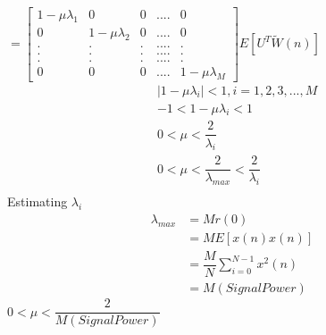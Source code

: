 \documentclass[journal,12pt,twocolumn]{IEEEtran}
\begin{document}
$ =\begin{bmatrix}
   1 - \mu \lambda_1 & 0 & 0 & .... & 0 \\0 & 1 - \mu \lambda_2 & 0 &  .... & 0\\ . & . & . & .... & . \\
   . & . & . & .... & .\\ . & . & . & .... & .\\
0 & 0 & 0 & .... & 1 - \mu \lambda_M   \end{bmatrix}E[U^{T}\tilde W(n)]$
\begin{align*}
&\mid 1-\mu \lambda_i \mid < 1 ,  i =1,2,3,...,M\\
&-1 < 1-\mu \lambda_i < 1  \\
&0 < \mu < \dfrac{2}{\lambda_i} \\
&0 < \mu < \dfrac{2}{\lambda_{max}} < \dfrac{2}{\lambda_i} \\ 
\end{align*}
Estimating $\lambda_i$ 
\begin{align*}
\lambda_{max} &= M r(0) \\ &= M E[x(n)x(n)] \\ &=\dfrac{M}{N}\sum_{i=0}^{N-1} x^{2}(n)\\ &= M ( Signal Power)
\end{align*}
$ 0 < \mu < \dfrac{2}{M ( Signal Power)} $
\end{document}
